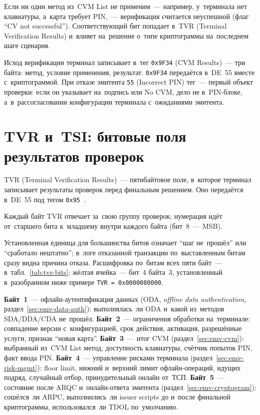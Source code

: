 Если ни один метод из~CVM List не применим~--- например, у~терминала нет
клавиатуры, а~карта требует PIN,~--- верификация считается неуспешной (флаг
\enquote{CV not successful}). Соответствующий бит попадает в~TVR (Terminal Verification Results) и~влияет на~решение о~типе
криптограммы на~последнем шаге сценария.

Исход верификации терминал записывает в~тег \texttt{0x9F34} (CVM Results)~---
три байта: метод, условие применения, результат. \texttt{0x9F34} передаётся
в~DE~55 вместе с~криптограммой. При отказе эмитента \texttt{55} (Incorrect PIN) тег~---
первый объект проверки: если он указывает на~подпись или No CVM, дело не
в~PIN-блоке, а~в~рассогласовании конфигурации терминала с~ожиданиями эмитента.

\section{TVR и~TSI: битовые поля результатов проверок}\label{sec:emv-tvr}

TVR (Terminal Verification Results)~--- пятибайтовое поле, в~которое терминал
записывает результаты проверок перед финальным решением. Оно передаётся в~DE~55
под тегом \texttt{0x95}~\cite{emvco-book3}.

Каждый байт TVR отвечает за~свою группу проверок; нумерация идёт от~старшего
бита к~младшему внутри каждого байта (бит~8~--- MSB).

Установленная единица для большинства битов означает \enquote{шаг не~прошёл}
или \enquote{сработало нештатно}; в~логе отказанной транзакции по~выставленным
битам сразу видна причина отказа. Расшифровка по~битам всех пяти байт~---
в~табл.~\ref{tab:tvr-bits}; жёлтая ячейка~--- бит~4 байта~3, установленный
в~разобранном ниже примере \texttt{TVR = 0x0000080000}.

\textbf{Байт~1}~--- офлайн-аутентификация данных (ODA, \textit{offline data
authentication}, раздел~\ref{sec:emv-data-auth}): выполнялась~ли ODA и~какой из~методов
SDA\slash DDA\slash CDA не~прошёл. \textbf{Байт~2}~--- ограничения обработки
на~терминале: совпадение версии с~конфигурацией, срок действия,
активация, разрешённые услуги, признак \enquote{новая карта}. \textbf{Байт~3}~--- итог CVM
(раздел~\ref{sec:emv-cvm}): выбранный из~CVM List метод, доступность
клавиатуры, счётчик попыток PIN, факт ввода PIN. \textbf{Байт~4}~---
управление рисками терминала (раздел~\ref{sec:emv-risk-mgmt}): floor limit,
нижний и~верхний лимит офлайн-операций, идущих подряд, случайный отбор,
принудительный онлайн от~ТСП.
\textbf{Байт~5}~--- состояние после ARQC и~онлайн-ответа эмитента
(раздел~\ref{sec:emv-cryptogram}): сошёлся~ли ARPC, выполнились~ли issuer
scripts до и~после финальной криптограммы, использовался~ли TDOL по~умолчанию.

